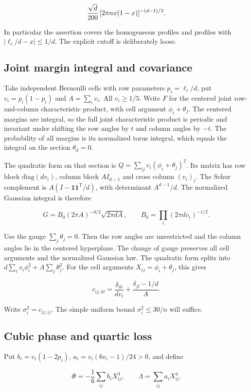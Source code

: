 \documentclass[11pt]{article}
\begin{document}
\[
\frac{\sqrt d}{200}\thinspace{}[2\pi n x(1-x)]^{-(d-1)/2}.
\]

In particular the assertion covers the homogeneous profiles and profiles with $|\ell_i/d-x|\le1/d$. The explicit cutoff is deliberately loose.

\subsection{Joint margin integral and covariance}

Take independent Bernoulli cells with row parameters $p_i=\ell_i/d$, put $v_i=p_i(1-p_i)$ and $A=\sum_i v_i$. All $v_i\ge1/5$. Write $F$ for the centered joint row-and-column characteristic product, with cell argument $\phi_i+\theta_j$. The centered margins are integral, so the full joint characteristic product is periodic and invariant under shifting the row angles by $t$ and column angles by $-t$. The probability of all margins is its normalized torus integral, which equals the integral on the section $\theta_d=0$.

The quadratic form on that section is $Q=\sum_{ij}v_i(\phi_i+\theta_j)^2$. Its matrix has row block $\mathrm{diag}(dv_i)$, column block $AI_{d-1}$ and cross column $(v_i)_i$. The Schur complement is $A(I-\mathbf1\mathbf1^{\mathsf T}/d)$, with determinant $A^{d-1}/d$. The normalized Gaussian integral is therefore

\[
G=B_0(2\pi A)^{-d/2}\sqrt{2\pi d A},\qquad
B_0=\prod_i (2\pi d v_i)^{-1/2}.
\]

Use the gauge $\sum_j\theta_j=0$. Then the row angles are unrestricted and the column angles lie in the centered hyperplane. The change of gauge preserves all cell arguments and the normalized Gaussian law. The quadratic form splits into $d\sum_i v_i\phi_i^2+A\sum_j\theta_j^2$. For the cell arguments $X_{ij}=\phi_i+\theta_j$, this gives

\[
c_{ij,kl}=\frac{\delta_{ik}}{d v_i}+\frac{\delta_{jl}-1/d}{A}.
\]

Write $\sigma_i^2=c_{ij,ij}$. The simple uniform bound $\sigma_i^2\le30/n$ will suffice.

\subsection{Cubic phase and quartic loss}

Put $b_i=v_i(1-2p_i)$, $a_i=v_i(6v_i-1)/24>0$, and define

\[
\Phi=-\frac16\sum_{ij}b_iX_{ij}^3,\qquad
\Lambda=\sum_{ij}a_iX_{ij}^4.
\]
\end{document}

